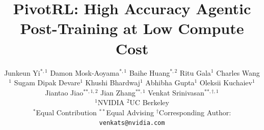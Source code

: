 \documentclass[11pt, logo, onecolumn, copyright, colorlinks=true, allcolors=blue]{nvidiatechreport}
\title{PivotRL: High Accuracy Agentic Post-Training at Low Compute Cost}
\author{
Junkeun Yi$^{*, 1}$\quad
Damon Mosk-Aoyama$^{*, 1}$\quad
Baihe Huang$^{*, 2}$\quad
Ritu Gala$^{1}$\quad
Charles Wang$^{1}$\quad
Sugam Dipak Devare$^{1}$\quad
Khushi Bhardwaj$^{1}$\quad
Abhibha Gupta$^{1}$\quad
Oleksii Kuchaiev$^{1}$\quad
Jiantao Jiao$^{**,1,2}$\quad
Jian Zhang$^{**,1}$\quad
Venkat Srinivasan$^{**,\dagger,1}$
\vspace{6pt}

{\footnotesize\textnormal{$^{1}$NVIDIA\quad
$^{2}$UC Berkeley}}

{\footnotesize\textnormal{$^{*}$Equal Contribution\quad
$^{**}$Equal Advising\quad
$^{\dagger}$Corresponding Author: \texttt{venkats@nvidia.com}}}
}
\date{\todo{date}}
\theoremstyle{plain}
\theoremstyle{definition}
\begin{document}


\maketitle







% 

% 







\newpage
\appendix
\onecolumn



\end{document}
